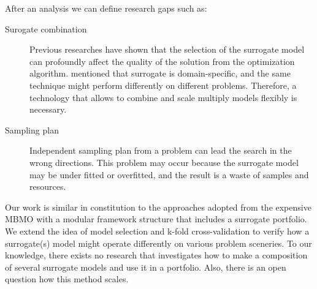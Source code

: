         After an analysis we can define research gaps such as:
        \begin{description}
            \item[Surogate combination] Previous researches have shown that the selection of the surrogate model can profoundly affect the quality of the solution from the optimization algorithm. \cite{LuST19} mentioned that surrogate is domain-specific, and the same technique might perform differently on different problems. Therefore, a technology that allows to combine and scale multiply models flexibly is necessary.
            \item[Sampling plan] Independent sampling plan from a problem can lead the search in the wrong directions. This problem may occur because the surrogate model may be under fitted or overfitted, and the result is a waste of samples and resources.
        \end{description}


        Our work is similar in constitution to the approaches adopted from the expensive MBMO \cite{SoftSurvey} with a modular framework structure that includes a surrogate portfolio. We extend the idea of model selection and k-fold cross-validation to verify how a surrogate(s) model might operate differently on various problem sceneries. To our knowledge, there exists no research that investigates how to make a composition of several surrogate models and use it in a portfolio. Also, there is an open question how this method scales.









